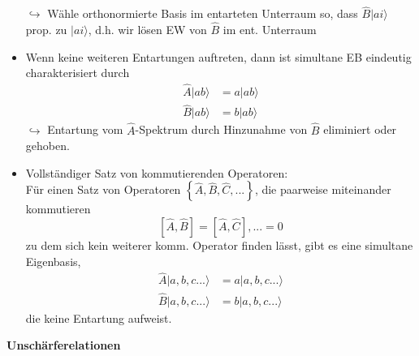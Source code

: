\documentclass[10pt,article,colorback,accentcolor=tud9d]{scrartcl}
\begin{document}
\begin{itemize}
      $\hookrightarrow$ Wähle orthonormierte Basis im entarteten Unterraum so, dass $\hat{B}|ai\rangle$ prop. zu $|ai\rangle$, d.h. wir lösen EW von $\hat{B}$ im ent. Unterraum
    \item Wenn keine weiteren Entartungen auftreten, dann ist simultane EB eindeutig charakterisiert durch 
      \begin{equation}
      \begin{aligned}
        \hat{A}|ab\rangle&=a|ab\rangle\\
        \hat{B}|ab\rangle&=b|ab\rangle
      \end{aligned}
      \end{equation}
      $\hookrightarrow$ Entartung vom $\hat{A}$-Spektrum durch Hinzunahme von $\hat{B}$ eliminiert oder gehoben.
    \item Vollständiger Satz von kommutierenden Operatoren:\\
      Für einen Satz von Operatoren $\left\{\hat{A},\hat{B},\hat{C},...\right\}$, die paarweise miteinander kommutieren
      \begin{equation}
      \left[\hat{A},\hat{B}\right]=\left[\hat{A},\hat{C}\right],...=0
      \end{equation}
      zu dem sich kein weiterer komm. Operator finden lässt, gibt es eine simultane Eigenbasis, 
      \begin{equation}
      \begin{aligned}
        \hat{A}|a,b,c...\rangle&=a|a,b,c...\rangle\\
        \hat{B}|a,b,c...\rangle&=b|a,b,c...\rangle
      \end{aligned}
      \end{equation}
      die keine Entartung aufweist.
  \end{itemize}
\textbf{Unschärferelationen}
\end{document}
